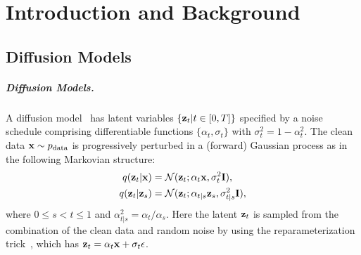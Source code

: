 \chapter{Introduction and Background} \label{chap:chap-1}

\section{Diffusion Models}
\paragraph{Diffusion Models.} A diffusion model~\cite{song2020score, ho2020denoising} has latent variables $\{\mathbf{z}_t | t \in [0, T]\}$ specified by a noise schedule comprising differentiable functions $\{\alpha_t, \sigma_t\}$ with $\sigma^2_t = 1 - \alpha^2_t$.
The clean data $\mathbf{x} \sim p_\mathrm{data}$ is progressively perturbed in a (forward) Gaussian process as in the following Markovian structure:
\begin{align}
    q(\mathbf{z}_t | \mathbf{x})& = \mathcal{N}(\mathbf{z}_t; \alpha_t \mathbf{x}, \sigma_t^2 \mathbf{I}), \\
    q(\mathbf{z}_t | \mathbf{z}_s)& = \mathcal{N}(\mathbf{z}_t; \alpha_{t|s}\mathbf{z}_s, \sigma^2_{t|s}\mathbf{I}),
    \label{eq:forward}
\end{align}
where $0 \leq s < t \leq 1$ and $\alpha^2_{t|s} = \alpha_t / \alpha_s$.
Here the latent $\mathbf{z}_t$ is sampled from the combination of the clean data and random noise by using the reparameterization trick~\cite{kingma2013auto}, which has $\mathbf{z}_t = \alpha_t\mathbf{x} + \sigma_t \epsilon$.

